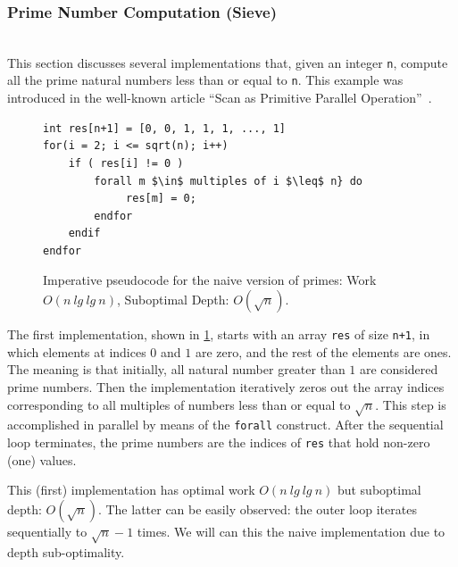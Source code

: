 \documentclass[acmsmall,review]{acmart}\settopmatter{printfolios=true,printccs=false,printacmref=false}
\begin{document}
\subsubsection{Prime Number Computation (Sieve)}
\label{subsubsub:primes}
$\mbox{ }$\\

This section discusses several implementations that, given
an integer {\tt n}, compute all the prime natural numbers 
less than or equal to {\tt n}. This example was introduced
in the well-known article ``Scan as Primitive Parallel 
Operation''~\cite{segScan}.

\begin{figure}
\begin{lstlisting}[mathescape=true]
int res[n+1] = [0, 0, 1, 1, 1, ..., 1]
for(i = 2; i <= sqrt(n); i++)
    if ( res[i] != 0 )
        forall m $\in$ multiples of i $\leq$ n} do
             res[m] = 0;
        endfor
    endif
endfor
\end{lstlisting}\vspace{-4ex}
\caption{Imperative pseudocode for the naive version of primes:
         Work $O(n \ lg \ lg \ n)$, Suboptimal Depth: $O(\sqrt{n})$. }
\label{fig:primes-naive-Imp}
\end{figure}

\medskip

The first implementation, shown in \cref{fig:primes-naive-Imp}, starts 
with an array {\tt res} of size {\tt n+1}, in which elements at 
indices $0$ and $1$ are zero, and the rest of the elements are ones. 
The meaning is that initially, all natural number greater than $1$ 
are considered prime numbers.
Then the implementation iteratively zeros out the array indices 
corresponding to all multiples of numbers less than or equal to $\sqrt{n}$.
This step is accomplished in parallel by means of the \lstinline{forall}
construct.   After the sequential loop terminates, the prime numbers
are the indices of {\tt res} that hold non-zero (one) values.

This (first) implementation has optimal work $O(n \ lg \ lg \ n)$ 
but suboptimal depth: $O(\sqrt{n})$. The latter can be easily observed:
the outer loop iterates sequentially to $\sqrt{n}-1$ times. We will
can this the naive implementation due to depth sub-optimality.
\end{document}
